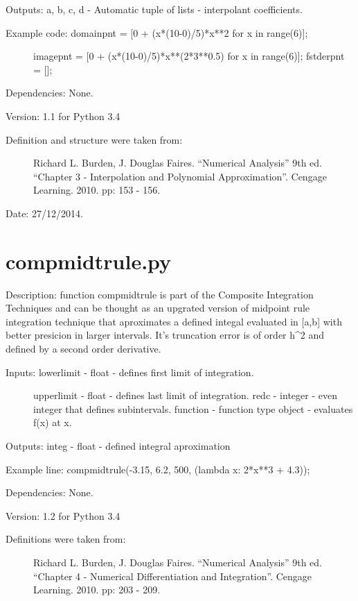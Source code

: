 \documentclass[letterpaper,10pt,oneside]{sphinxmanual}
\theoremstyle{plain}%
\theoremstyle{definition}%
\theoremstyle{remark}%
\begin{document}
Outputs: a, b, c, d - Automatic tuple of lists - interpolant coefficients.
\begin{description}
\item[{Example code: domainpnt = {[}0 + (x*(10-0)/5)*x**2 for x in range(6){]};}] \leavevmode
imagepnt = {[}0 + (x*(10-0)/5)*x**(2*3**0.5) for x in range(6){]};
fstderpnt = {[}{]};

\end{description}

Dependencies: None.

Version: 1.1 for Python 3.4
\begin{description}
\item[{Definition and structure were taken from:}] \leavevmode
Richard L. Burden, J. Douglas Faires. ``Numerical Analysis'' 9th ed.
``Chapter 3 - Interpolation and Polynomial Approximation''. 
Cengage Learning. 2010. pp: 153 - 156.

\end{description}




Date: 27/12/2014.


\section{compmidtrule.py}
\label{code:module-compmidtrule}\label{code:compmidtrule-py}
Description: function compmidtrule is part of the Composite Integration
Techniques and can be thought as an upgrated version of midpoint rule
integration technique that aproximates a defined integal evaluated in {[}a,b{]}
with better presicion in larger intervals. It's truncation error is of order
h\textasciicircum{}2 and defined by a second order derivative.
\begin{description}
\item[{Inputs: lowerlimit - float - defines first limit of integration.}] \leavevmode
upperlimit - float - defines last limit of integration.
redc - integer - even integer that defines subintervals.
function - function type object - evaluates f(x) at x.

\end{description}

Outputs: integ - float - defined integral aproximation

Example line: compmidtrule(-3.15, 6.2, 500, (lambda x: 2*x**3 + 4.3));

Dependencies: None.

Version: 1.2 for Python 3.4
\begin{description}
\item[{Definitions were taken from:}] \leavevmode
Richard L. Burden, J. Douglas Faires. ``Numerical Analysis'' 9th ed.
``Chapter 4 - Numerical Differentiation and Integration''. 
Cengage Learning. 2010. pp: 203 - 209.

\end{description}
\end{document}
